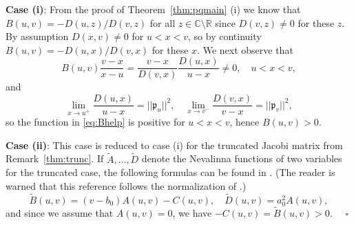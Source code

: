 \documentclass [12pt]{article}
\newcommand{\C}{\mathbb{C}}
\newcommand{\R}{\mathbb{R}}
\begin{document}
{\bf Case (i)}: From the proof of Theorem~\ref{thm:pqmain} (i) we know that 
$B(u,v)=-D(u,z)/D(v,z)$ for all $z\in\C\setminus\R$ since $D(v,z)\neq 0$ for these $z$. By assumption $D(x,v)\neq 0$ for $u<x<v$, so by continuity
$B(u,v)=-D(u,x)/D(v,x)$ for these $x$. We next observe that
\begin{equation}\label{eq:Bhelp}
B(u,v)\frac{v-x}{x-u}=\frac{v-x}{D(v,x)}\frac{D(u,x)}{u-x} \neq 0,\quad u<x<v,
\end{equation} 
and 
$$
\lim_{x\to u^+}\frac{D(u,x)}{u-x}=||\mathfrak{p}_u||^2,\quad
\lim_{x\to v^-}\frac{D(v,x)}{v-x}=||\mathfrak{p}_v||^2,
$$
so the function in \eqref{eq:Bhelp} is positive for $u<x<v$, hence $B(u,v)>0$.

{\bf Case (ii)}: This case is reduced to case (i) for the truncated Jacobi matrix from Remark~\ref{thm:trunc}. If $\widetilde{A},\ldots,\widetilde{D}$ denote the Nevalinna functions of two variables for the truncated case, the following formulas can be found in \cite{Pe}. (The reader is warned that this reference follows the normalization of \cite{Bu:Ca}.)
\begin{equation*}\label{eq:tilde}
\widetilde{B}(u,v)=(v-b_0)A(u,v)-C(u,v),\quad \widetilde{D}(u,v)=a_0^2A(u,v),
\end{equation*}
and since we assume that $A(u,v)=0$, we have $-C(u,v)=\widetilde{B}(u,v)>0$.
$\quad\square$ 
\end{document}
